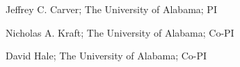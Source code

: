 
\vspace*{\parskip}

\begin{enumerate*}
\item Jeffrey C. Carver; The University of Alabama; PI
\item Nicholas A. Kraft; The University of Alabama; Co-PI
\item David Hale; The University of Alabama; Co-PI
\end{enumerate*}

